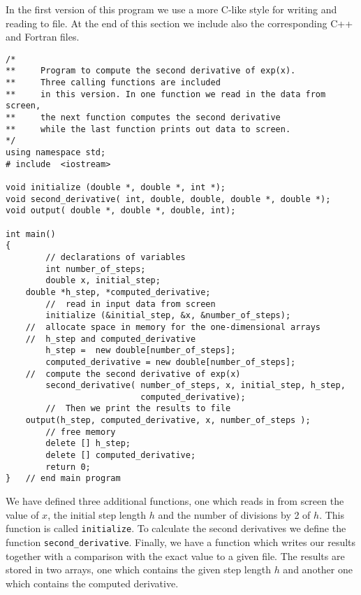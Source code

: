 In the first version of this program we use a more C-like style for writing and reading to file.
At the end of this section we include also the corresponding C++ and Fortran files.
\begin{lstlisting}[title={\url{http://folk.uio.no/mhjensen/compphys/programs/chapter03/cpp/program1.cpp}}]
/*
**     Program to compute the second derivative of exp(x). 
**     Three calling functions are included
**     in this version. In one function we read in the data from screen,
**     the next function computes the second derivative
**     while the last function prints out data to screen.
*/
using namespace std;
# include  <iostream> 

void initialize (double *, double *, int *);
void second_derivative( int, double, double, double *, double *);
void output( double *, double *, double, int);

int main()
{
        // declarations of variables 
        int number_of_steps;
        double x, initial_step;
	double *h_step, *computed_derivative;
        //  read in input data from screen 
        initialize (&initial_step, &x, &number_of_steps);
	//  allocate space in memory for the one-dimensional arrays  
	//  h_step and computed_derivative                           
        h_step =  new double[number_of_steps];
        computed_derivative = new double[number_of_steps];
	//  compute the second derivative of exp(x) 
        second_derivative( number_of_steps, x, initial_step, h_step, 
                           computed_derivative);        
        //  Then we print the results to file  
	output(h_step, computed_derivative, x, number_of_steps );
        // free memory
        delete [] h_step;
        delete [] computed_derivative; 
        return 0;
}   // end main program 
\end{lstlisting}
 We have defined three additional functions, one which 
reads in from screen the value of $x$, the initial step length $h$
and the number of divisions by 2 of $h$. This function is called
\verb?initialize?. To calculate the second derivatives we define the function 
\verb?second_derivative?. 
Finally, we have a  function which writes our results
together with a comparison with the exact value to a given file.
The results are stored in two arrays, one which contains the 
given step length $h$ and another one which contains 
the computed derivative.

